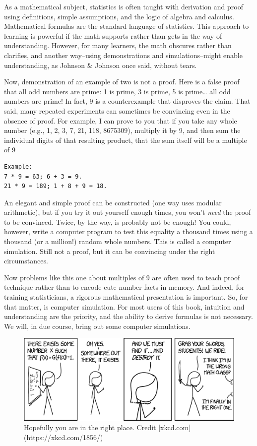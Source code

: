 \documentclass[
  openany]{book}
\begin{document}
As a mathematical subject, statistics is often taught with derivation and proof using definitions, simple assumptions, and the logic of algebra and calculus. Mathematical formulas are the standard language of statistics. This approach to learning is powerful if the math supports rather than gets in the way of understanding. However, for many learners, the math obscures rather than clarifies, and another way--using demonstrations and simulations--might enable understanding, as Johnson \& Johnson once said, without tears.

Now, demonstration of an example of two is not a proof. Here is a false proof that all odd numbers are prime: 1 is prime, 3 is prime, 5 is prime\ldots{} all odd numbers are prime! In fact, 9 is a counterexample that disproves the claim. That said, many repeated experiments can sometimes be convincing even in the absence of proof. For example, I can prove to you that if you take any whole number (e.g., 1, 2, 3, 7, 21, 118, 8675309), multiply it by 9, and then sum the individual digits of that resulting product, that the sum itself will be a multiple of 9

\begin{verbatim}
Example: 
7 * 9 = 63; 6 + 3 = 9.
21 * 9 = 189; 1 + 8 + 9 = 18. 
\end{verbatim}

An elegant and simple proof can be constructed (one way uses modular arithmetic), but if you try it out yourself enough times, you won't \emph{need} the proof to be convinced. Twice, by the way, is probably not be enough! You could, however, write a computer program to test this equality a thousand times using a thousand (or a million!) random whole numbers. This is called a computer simulation. Still not a proof, but it can be convincing under the right circumstances.

Now problems like this one about multiples of 9 are often used to teach proof technique rather than to encode cute number-facts in memory. And indeed, for training statisticians, a rigorous mathematical presentation is important. So, for that matter, is computer simulation. For most users of this book, intuition and understanding are the priority, and the ability to derive formulas is not necessary. We will, in due course, bring out some computer simulations.

\begin{figure}

{\centering \includegraphics[width=0.9\linewidth]{images/existence_proof_2x} 

}

\caption{Hopefully you are in the right place. Credit   [xkcd.com](https://xkcd.com/1856/)}\label{fig:xkcd-preamble}
\end{figure}
\end{document}
